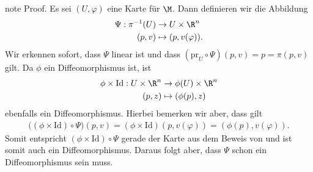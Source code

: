 \documentclass[letterpaper,10pt,english]{jupyterBook}
\begin{document}
\begin{sphinxadmonition}{note}
\sphinxAtStartPar
Proof. Es sei \((U,\varphi)\) eine Karte für \(\M\).
Dann definieren wir die Abbildung
\begin{equation*}
\begin{split}\Psi: \pi^{-1}(U) &\to U\times \R^n\\
(p,v) &\mapsto (p, v(\varphi)).\end{split}
\end{equation*}
\sphinxAtStartPar
Wir erkennen sofort, dass \(\Psi\) linear ist und dass \((\text{pr}_U\circ\Psi)(p,v) = p = \pi(p,v)\) gilt.
Da \(\phi\) ein Diffeomorphismus ist, ist
\begin{equation*}
\begin{split}\phi\times\text{Id}:U\times \R^n &\to \phi(U)\times\R^n\\
(p,z) &\mapsto (\phi(p), z)\end{split}
\end{equation*}
\sphinxAtStartPar
ebenfalls ein Diffeomorphismus.
Hierbei bemerken wir aber, dass gilt
\begin{equation*}
\begin{split}\big((\phi\times\text{Id})\circ \Psi\big)(p,v) = (\phi\times\text{Id})(p, v(\varphi)) = (\phi(p), v(\varphi)).\end{split}
\end{equation*}
\sphinxAtStartPar
Somit entspricht \((\phi\times\text{Id})\circ \Psi\) gerade der Karte aus dem Beweis von {\hyperref[\detokenize{manifolds/tangential:lem:tanman}]{}} und ist somit auch ein Diffeomorphismus.
Daraus folgt aber, dass \(\Psi\) schon ein Diffeomorphismus sein muss.
\end{sphinxadmonition}
\end{document}
